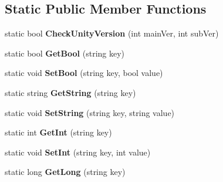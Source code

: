 \subsection*{Static Public Member Functions}
\begin{DoxyCompactItemize}
\item 
\mbox{\label{class_lerp2_a_p_i_1_1_lerped_core_ab24f1c6e4a14adc472022a48a21d81d4}} 
static bool {\bfseries Check\+Unity\+Version} (int main\+Ver, int sub\+Ver)
\item 
\mbox{\label{class_lerp2_a_p_i_1_1_lerped_core_a561a69b0d322804e7d08899b584188df}} 
static bool {\bfseries Get\+Bool} (string key)
\item 
\mbox{\label{class_lerp2_a_p_i_1_1_lerped_core_a48b631ddb59cbfbe36158a72037e674b}} 
static void {\bfseries Set\+Bool} (string key, bool value)
\item 
\mbox{\label{class_lerp2_a_p_i_1_1_lerped_core_ab15116e8a0a077a93db066e24d737d9d}} 
static string {\bfseries Get\+String} (string key)
\item 
\mbox{\label{class_lerp2_a_p_i_1_1_lerped_core_a37695960379368ba971962941ced7c0b}} 
static void {\bfseries Set\+String} (string key, string value)
\item 
\mbox{\label{class_lerp2_a_p_i_1_1_lerped_core_ac6a20617421e0b788afb91f189986d57}} 
static int {\bfseries Get\+Int} (string key)
\item 
\mbox{\label{class_lerp2_a_p_i_1_1_lerped_core_a604b706b940c895a0b6598cc98bdcc0f}} 
static void {\bfseries Set\+Int} (string key, int value)
\item 
\mbox{\label{class_lerp2_a_p_i_1_1_lerped_core_a8c3bf0c6dc234b2955fdc29bd780d276}} 
static long {\bfseries Get\+Long} (string key)
\item 
\mbox{\label{class_lerp2_a_p_i_1_1_lerped_core_a88491e9a5266926892183670b659c4f9}} 

\end{DoxyCompactItemize}

